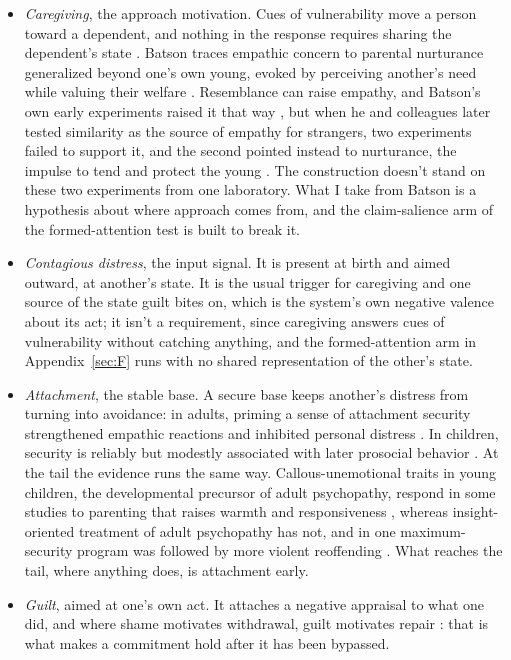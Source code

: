 \begin{itemize}
\item \emph{Caregiving}, the approach motivation. Cues of vulnerability move a person toward a dependent, and nothing in the response requires sharing the dependent's state \autocite{preston2013origins}. Batson traces empathic concern to parental nurturance generalized beyond one's own young, evoked by perceiving another's need while valuing their welfare \autocite{batson2011altruism}. Resemblance can raise empathy, and Batson's own early experiments raised it that way \autocite{batson1981empathic}, but when he and colleagues later tested similarity as the source of empathy for strangers, two experiments failed to support it, and the second pointed instead to nurturance, the impulse to tend and protect the young \autocite{batson2005similarity}. The construction doesn't stand on these two experiments from one laboratory. What I take from Batson is a hypothesis about where approach comes from, and the claim-salience arm of the formed-attention test is built to break it.
\item \emph{Contagious distress}, the input signal. It is present at birth and aimed outward, at another's state. It is the usual trigger for caregiving and one source of the state guilt bites on, which is the system's own negative valence about its act; it isn't a requirement, since caregiving answers cues of vulnerability without catching anything, and the formed-attention arm in Appendix~\ref{sec:F} runs with no shared representation of the other's state.
\item \emph{Attachment}, the stable base. A secure base keeps another's distress from turning into avoidance: in adults, priming a sense of attachment security strengthened empathic reactions and inhibited personal distress \autocite{mikulincer2001attachment}. In children, security is reliably but modestly associated with later prosocial behavior \autocite{deneault2023metaanalysis}. At the tail the evidence runs the same way. Callous-unemotional traits in young children, the developmental precursor of adult psychopathy, respond in some studies to parenting that raises warmth and responsiveness \autocite{hawes2005treatment,waller2013parenting}, whereas insight-oriented treatment of adult psychopathy has not, and in one maximum-security program was followed by more violent reoffending \autocite{rice1992evaluation}. What reaches the tail, where anything does, is attachment early.
\item \emph{Guilt}, aimed at one's own act. It attaches a negative appraisal to what one did, and where shame motivates withdrawal, guilt motivates repair \autocite{tangney2007moral}: that is what makes a commitment hold after it has been bypassed.
\end{itemize}

